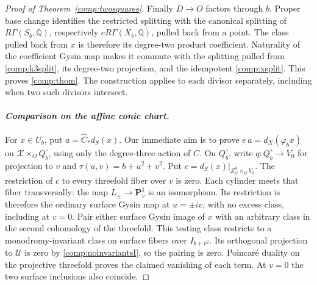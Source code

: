 \documentclass[11pt]{amsart}
\newcommand{\Q}{\mathbb Q}
\newcommand{\PP}{\mathbf P}
\theoremstyle{definition}
\theoremstyle{remark}
\numberwithin{equation}{section}
\begin{document}
\begin{proof}[Proof of Theorem~\ref{comp:twosquares}]
Finally $D\to O$ factors through $b$.  Proper base change identifies
the restricted splitting with the canonical splitting of
$R\Gamma(S_b,\Q)$, respectively $eR\Gamma(X_b,\Q)$, pulled back from a
point.  The class pulled back from $x$ is therefore its degree-two product
coefficient.  Naturality of the coefficient Gysin map makes it commute
with the splitting pulled from \eqref{comp:k3split}, its degree-two
projection, and the idempotent \eqref{comp:xsplit}.  This proves
\eqref{comp:thom}.  The construction applies to each divisor separately,
including when two such divisors intersect.

\paragraph{\emph{Comparison on the affine conic chart.}}
For $x\in U_b$, put $a=\widehat C_*d_S(x)$.  Our immediate aim is
to prove $e\,a=d_X(\varphi_bx)$ on $\mathcal X\times_OQ_b^\circ$,
using only the degree-three action of $C$.
On $Q_b^\circ$, write $q:Q_b^\circ\to V_0$ for projection to $v$ and
$\tau(u,v)=b+u^2+v^2$.
Put
$c=d_S(x)|_{Z^S_G\times_GV_0}$.  The restriction of $c$ to every
threefold fiber over $v$ is zero.  Each cylinder meets that fiber
transversally: the map $L_\pm\to\PP^1_v$ is an isomorphism.
Its restriction is therefore the ordinary surface Gysin map at
$u=\pm iv$, with no excess class, including at $v=0$.
Pair either surface Gysin image of $x$ with an arbitrary class in
the second cohomology of the threefold.  This testing class restricts
to a monodromy-invariant class on surface fibers over
$I_{b+v^2}$.  Its orthogonal projection to $\mathscr U$ is zero by
\eqref{comp:noinvariantsI}, so the pairing is zero.  Poincar\'e duality on
the projective threefold proves the claimed vanishing of each term.
At $v=0$ the two surface inclusions also coincide.


\end{proof}
\end{document}
